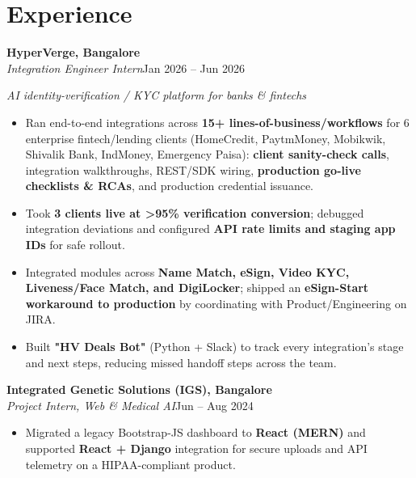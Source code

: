 \documentclass[10pt,a4paper]{article}
\begin{document}
\section*{Experience}
\vspace{1pt}\textbf{HyperVerge, Bangalore}\\
\textit{Integration Engineer Intern}\hfill Jan 2026 -- Jun 2026\par\vspace{1pt}
{\small\itshape AI identity-verification / KYC platform for banks \& fintechs}\par\vspace{1pt}
\begin{itemize}
\item Ran end-to-end integrations across \textbf{15+ lines-of-business/workflows} for 6 enterprise fintech/lending clients (HomeCredit, PaytmMoney, Mobikwik, Shivalik Bank, IndMoney, Emergency Paisa): \textbf{client sanity-check calls}, integration walkthroughs, REST/SDK wiring, \textbf{production go-live checklists \& RCAs}, and production credential issuance.
\item Took \textbf{3 clients live at \textgreater{}95\% verification conversion}; debugged integration deviations and configured \textbf{API rate limits and staging app IDs} for safe rollout.
\item Integrated modules across \textbf{Name Match, eSign, Video KYC, Liveness/Face Match, and DigiLocker}; shipped an \textbf{eSign-Start workaround to production} by coordinating with Product/Engineering on JIRA.
\item Built \textbf{"HV Deals Bot"} (Python + Slack) to track every integration's stage and next steps, reducing missed handoff steps across the team.
\end{itemize}
\vspace{1pt}\textbf{Integrated Genetic Solutions (IGS), Bangalore}\\
\textit{Project Intern, Web \& Medical AI}\hfill Jun -- Aug 2024\par\vspace{1pt}
\begin{itemize}
\item Migrated a legacy Bootstrap-JS dashboard to \textbf{React (MERN)} and supported \textbf{React + Django} integration for secure uploads and API telemetry on a HIPAA-compliant product.
\end{itemize}
\end{document}

